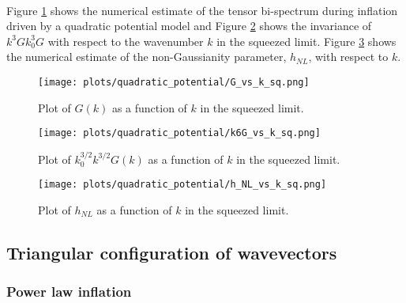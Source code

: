 \documentclass[12pt,a4paper,oneside]{book}
\begin{document}
\paragraph*{} Figure \ref{fig:sq_G_vs_k_quad} shows the numerical estimate of the 
tensor bi-spectrum during inflation driven by a quadratic potential model and Figure 
\ref{fig:sq_k6G_vs_k_quad} shows the invariance of $k^3Gk_0^3G$ with respect to 
the wavenumber $k$ in the squeezed limit. Figure \ref{fig:sq_h_NL_vs_k_quad} shows 
the numerical estimate of the non-Gaussianity parameter, $h_{NL}$, with respect to $k$.

\begin{figure}
\begin{center}
\texttt{[image: plots/quadratic\_potential/G\_vs\_k\_sq.png]}
\caption[Plot of $G(k)$ as a function of $k$ in the squeezed limit in quadratic potential model.]
{Plot of $G(k)$ as a function of $k$ in the squeezed limit.}
\label{fig:sq_G_vs_k_quad}
\end{center}
\end{figure}

\begin{figure}
\begin{center}
\texttt{[image: plots/quadratic\_potential/k6G\_vs\_k\_sq.png]}
\caption[Plot of $k_0^{3/2}k^{3/2}G(k)$ as a function of $k$ in the squeezed limit in quadratic potential model.]
{Plot of $k_0^{3/2}k^{3/2}G(k)$ as a function of $k$ in the squeezed limit.}
\label{fig:sq_k6G_vs_k_quad}
\end{center}
\end{figure}

\begin{figure}
\begin{center}
\texttt{[image: plots/quadratic\_potential/h\_NL\_vs\_k\_sq.png]}
\caption[Plot of $h_{NL}$ as a function of $k$ in the squeezed limit in quadratic potential model.]
{Plot of $h_{NL}$ as a function of $k$ in the squeezed limit.}
\label{fig:sq_h_NL_vs_k_quad}
\end{center}
\end{figure}

\subsection{Triangular configuration of wavevectors}

\subsubsection{Power law inflation}
\end{document}
